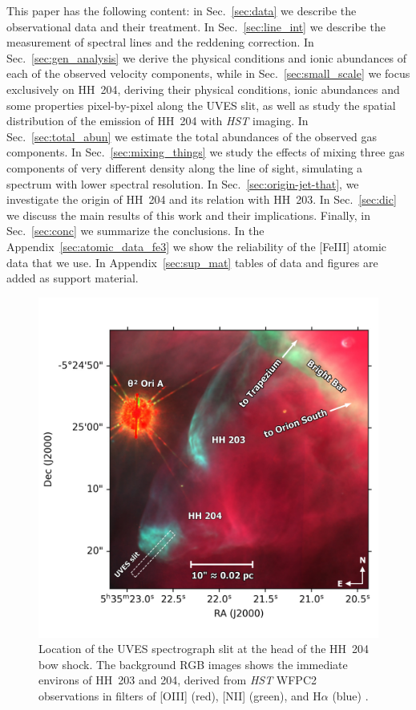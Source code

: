 \documentclass[twocolumn]{aastex63}
\begin{document}
%
This paper has the following content: in Sec.~\ref{sec:data} we describe the observational data and their  treatment. In Sec.~\ref{sec:line_int} we describe the measurement of spectral lines and the reddening correction. In Sec.~\ref{sec:gen_analysis} we derive the physical conditions and  ionic abundances of each of the observed velocity components, while in Sec.~\ref{sec:small_scale} we focus exclusively on HH~204, deriving their physical conditions, ionic abundances and some properties pixel-by-pixel along the UVES slit, as well as study the spatial distribution of the emission of HH~204 with \textit{HST} imaging. In Sec.~\ref{sec:total_abun} we estimate the total abundances of the observed gas components. In Sec.~\ref{sec:mixing_things} we study the effects of mixing three gas components of very different density along the line of sight, simulating a spectrum with lower spectral resolution. In Sec.~\ref{sec:origin-jet-that}, we investigate the origin of HH~204 and its relation with HH~203. In Sec.~\ref{sec:dic} we discuss the main results of this work and their implications. Finally, in Sec.~\ref{sec:conc} we summarize the conclusions. In the Appendix~\ref{sec:atomic_data_fe3} we show the reliability of the [Fe\thinspace III] atomic data that we use. In Appendix~\ref{sec:sup_mat} tables of data and figures are added as support material.


\begin{figure}
  \centering
  \includegraphics[width=\linewidth]{hh204-finding-chart-simple}
  \caption{
    Location of the UVES spectrograph slit at the head of the HH~204 bow shock.
    The background RGB images shows the immediate environs of HH~203 and 204,
    derived from \textit{HST} WFPC2 observations \citep{ODell:1996a} in filters of
    [O\thinspace III] (red), [N\thinspace II] (green), and H$\alpha$ (blue) .
    }
  \label{fig:hh204-finding-chart-simple}
\end{figure}
\end{document}
